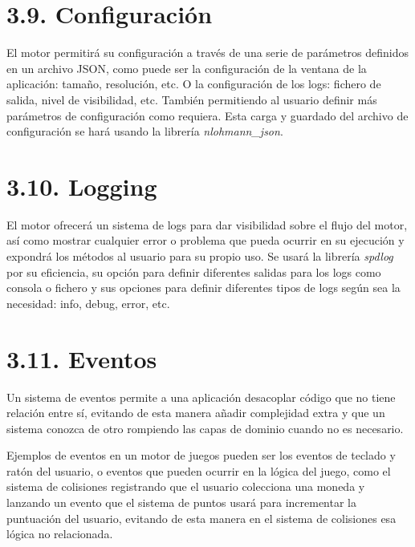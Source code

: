 \section*{3.9. Configuración}\label{sec:settings}

El motor permitirá su configuración a través de una serie de parámetros definidos en un archivo JSON, como puede ser
la configuración de la ventana de la aplicación: tamaño, resolución, etc. O la configuración de los logs: fichero de salida,
nivel de visibilidad, etc. También permitiendo al usuario definir más parámetros de configuración como requiera. Esta carga
y guardado del archivo de configuración se hará usando la librería \textit{nlohmann\_json}\cite{nlohmann_json}.

\section*{3.10. Logging}\label{sec:logging}

El motor ofrecerá un sistema de logs para dar visibilidad sobre el flujo del motor, así como mostrar cualquier error
o problema que pueda ocurrir en su ejecución y expondrá los métodos al usuario para su propio uso. Se usará la librería \textit{spdlog}\cite{spdlog}
por su eficiencia, su opción para definir diferentes salidas para los logs como consola o fichero
y sus opciones para definir diferentes tipos de logs según sea la necesidad: info, debug, error, etc. 

\section*{3.11. Eventos}\label{sec:events_layer}

Un sistema de eventos permite a una aplicación desacoplar código que no tiene relación entre sí,
evitando de esta manera añadir complejidad extra y que un sistema conozca de otro rompiendo las capas de dominio cuando
no es necesario. 

Ejemplos de eventos en un motor de juegos pueden ser los eventos de teclado y ratón del usuario, o eventos 
que pueden ocurrir en la lógica del juego, como el sistema de colisiones registrando que el usuario
colecciona una moneda y lanzando un evento que el sistema de puntos usará para incrementar la puntuación del usuario,
evitando de esta manera en el sistema de colisiones esa lógica no relacionada.

